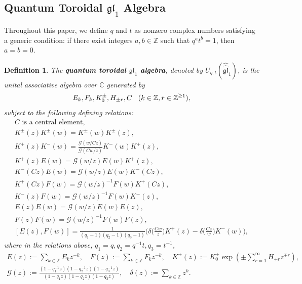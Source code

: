 \documentclass[12pt,reqno,a4paper]{amsart}
\newcommand{\cals}[1]{\mathcal{#1}}
\newcommand{\fraks}[1]{\mathfrak{#1}}
\newcommand{\bb}[1]{\mathbb{#1}}
\numberwithin{equation}{section}
\newtheorem{dfn}[thm]{Definition}
\theoremstyle{definition}
\begin{document}
\subsection{Quantum Toroidal $\fraks{gl}_1$ Algebra}

Throughout this paper, we define $q$ and $t$ as nonzero complex numbers satisfying a generic condition: if there exist integers $a,b \in \bb{Z}$ such that $q^at^b = 1$, then $a = b = 0$.

\begin{dfn}
The \textbf{quantum toroidal $\fraks{gl}_1$ algebra}, denoted by $U_{q,t}(\widehat{\widehat{\fraks{gl}}}_1)$, is the unital associative algebra over $\bb{C}$ generated by 
\begin{align}
	E_k, F_k, K^{\pm}_0, H_{\pm r}, C  \hspace{0.3cm} (k \in \bb{Z}, r \in \bb{Z}^{\geq 1}), 
\end{align}
subject to the following defining relations:
\begin{gather}
	C \text{ is a central element}, 
	\\
	K^{\pm}(z)K^{\pm}(w) = 		K^{\pm}(w)K^{\pm}(z),
	\label{2.3main}
	\\
	K^{+}(z)K^-(w) = \frac{\cals{G}(w/C z)}{\cals{G}(C w/z)} K^-(w)K^{+}(z),
	\\
	K^+(z)E(w) = \cals{G}(w/z)E(w)K^+(z),
	\\
	K^-(C z)E(w) = \cals{G}(w/z)E(w)K^-(C z),
	\\
	K^+(C z)F(w) = \cals{G}(w/z)^{-1}F(w)K^+(C z),
	\\
	K^-(z)F(w) = \cals{G}(w/z)^{-1}F(w)K^-(z),
	\\
	\label{EEexchage}
	E(z)E(w) = \cals{G}(w/z)E(w)E(z),
	\\
	F(z)F(w) = \cals{G}(w/z)^{-1}F(w)F(z),
	\\
	[E(z),F(w)] = \frac{1}{(q_1 - 1)(q_2 - 1)(q_3 - 1)}
	\bigg(
	\delta\Big(\frac{Cw}{z}\Big)K^+(z) - \delta\Big(\frac{Cz}{w}\Big)K^-(w) 
	\bigg),
	\label{2.11main}
\end{gather}
where in the relations above, $q_1 = q, q_2 = q^{-1}t, q_3 = t^{-1}$, 
\begin{gather}
	E(z) := \sum_{k\in\mathbb{Z}} E_k z^{-k}, \quad
	F(z) := \sum_{k\in\mathbb{Z}} F_k z^{-k}, \quad
	K^{\pm}(z) := K_0^{\pm}\exp\left(
	\pm \sum_{r=1}^{\infty} H_{\pm r} z^{\mp r}
	\right), 
	\label{2.12}
	\\
	\cals{G}(z) := 
	\frac{(1 - q_1^{-1}z)(1 - q_2^{-1}z)(1 - q_3^{-1}z)}{
		(1 - q_1z)(1 - q_2z)(1 - q_3z)
	}, 
	\quad 
	\delta(z) := \sum_{k \in \bb{Z}}
	z^k. 
\end{gather}
\end{dfn}
\end{document}
